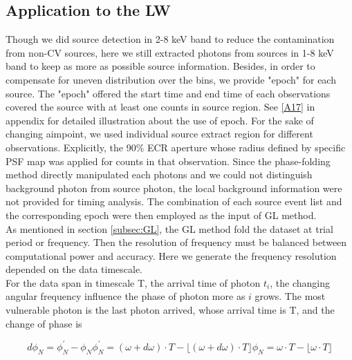 \documentclass[twoside,twocolumn]{aastex63}
\begin{document}
\subsection{Application to the LW}\label{subsec:appli}
Though we did source detection in 2-8 keV band to reduce the contamination from non-CV sources, here we still extracted photons from sources in 1-8 keV band to keep as more as possible source information. 
Besides, in order to compensate for uneven distribution over the bins, we provide "epoch" for each source. The "epoch" offered the start time and end time of each observations covered the source with at least one counts in source region. See \ref{A17} in appendix for detailed illustration about the use of epoch. 
For the sake of changing aimpoint, we used individual source extract region for different observations. Explicitly, the 90\% ECR aperture  whose radius defined by specific PSF map was applied for counts in that observation. Since the phase-folding method directly manipulated each photons and we could not distinguish background photon from source photon, the local background information were not provided for timing analysis. The combination of each source event list and the corresponding epoch were then employed as the input of GL method. 
\\
\indent
As mentioned in section \ref{subsec:GL}, the GL method fold the dataset at trial period or frequency. Then the resolution of frequency must be balanced between computational power and  accuracy. Here we generate the frequency resolution depended on the data timescale.
\\
\indent
For the data span in timescale T, the arrival time of photon $t_i$, the changing angular frequency influence the phase of photon more as $i$ grows. The most vulnerable photon is the last photon arrived, whose arrival time is T, and the change of phase is 

\begin{subequations}\label{fi}
\begin{equation}
	d\phi_{N}=\phi_{N}^{'}-\phi_{N}
\end{equation}
\begin{equation}
	\phi_{N}^{'}=(\omega +d\omega) \cdot T-\lfloor (\omega +d\omega) \cdot T \rfloor
\end{equation}
\begin{equation}
	\phi_{N}=\omega \cdot T-\lfloor \omega \cdot T \rfloor
\end{equation}
\end{subequations}
\\
\end{document}
